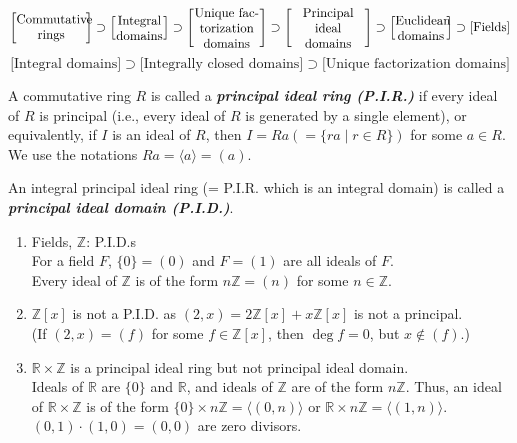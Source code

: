 \documentclass[twoside]{article}
\newcommand\Z{\mathbb Z}
\newcommand\R{\mathbb R}
\theoremstyle{remark}
\newcommand*\term[1]{\textbf{\textit{\mathversion{bold}#1}}}
\begin{document}
\[ \left[ \parbox{1.9cm}{\centering Commutative rings} \right] \supset \left[ \parbox{1.3cm}{\centering Integral domains} \right] \supset \left[ \parbox{1.8cm}{\centering Unique factorization domains} \right] \supset \left[ \parbox{2cm}{\centering Principal ideal domains} \right] \supset \left[ \parbox{1.4cm}{\centering Euclidean domains} \right] \supset \text{[Fields]} \]
\[ \text{[Integral domains]} \supset \text{[Integrally closed domains]} \supset \text{[Unique factorization domains]} \]

\begin{definition}%
  A commutative ring \(R\) is called a \term{principal ideal ring (P.I.R.)} if every ideal of \(R\) is principal (i.e., every ideal of \(R\) is generated by a single element), or equivalently, if \(I\) is an ideal of \(R\), then \(I = Ra (= \{ra \mid r \in R\})\) for some \(a \in R\). We use the notations \(Ra = \langle a \rangle = (a)\). \par
  An integral principal ideal ring (= P.I.R. which is an integral domain) is called a \term{principal ideal domain (P.I.D.)}.
\end{definition}

\begin{examples}
  \begin{enumerate}[label=\arabic*.]
    \item Fields, \(\Z\): P.I.D.s \\
    For a field \(F\), \(\{0\} = (0)\) and \(F = (1)\) are all ideals of \(F\). \\
    Every ideal of \(\Z\) is of the form \(n\Z = (n)\) for some \(n \in \Z\).
    \item \(\Z[x]\) is not a P.I.D. as \((2,x) = 2\Z[x] + x\Z[x]\) is not a principal. \\
    (If \((2,x) = (f)\) for some \(f \in \Z[x]\), then \(\deg f = 0\), but \(x \notin (f)\).)
    \item \(\R \times \Z\) is a principal ideal ring but not principal ideal domain. \\
    Ideals of \(\R\) are \(\{0\}\) and \(\R\), and ideals of \(\Z\) are of the form \(n\Z\). Thus, an ideal of \(\R \times \Z\) is of the form \(\{0\} \times n\Z = \langle(0,n)\rangle\) or \(\R \times n\Z = \langle(1,n)\rangle\). \\
    \((0,1) \cdot (1,0) = (0,0)\) are zero divisors.
  \end{enumerate}
\end{examples}
\end{document}
